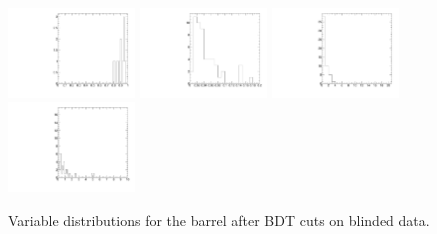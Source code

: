 \begin{figure}
  \includegraphics[width=0.3\textwidth]{Figures/AfterBDTCut_iso_Barrel.pdf}
  \includegraphics[width=0.3\textwidth]{Figures/AfterBDTCut_docatrk_Barrel.pdf}
  \includegraphics[width=0.3\textwidth]{Figures/AfterBDTCut_closetrk_Barrel.pdf}
  \includegraphics[width=0.3\textwidth]{Figures/AfterBDTCut_chi2dof_Barrel.pdf}
  \caption{Variable distributions for the barrel after BDT cuts on blinded data.}
  \label{fig:massPlotUnblinded}
\end{figure}


